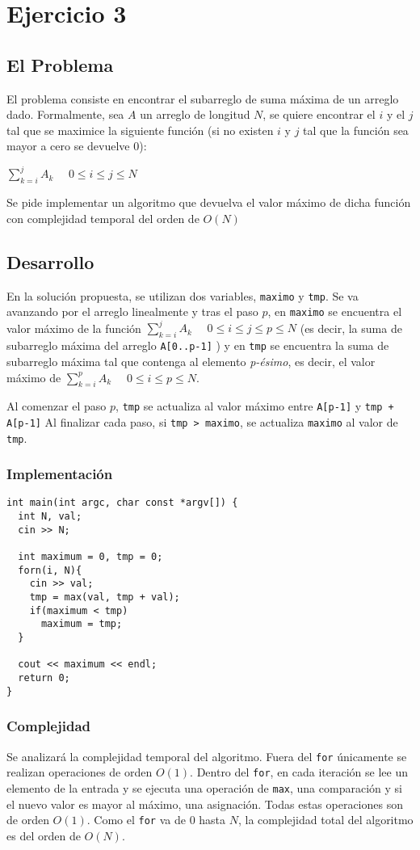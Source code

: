 \section{Ejercicio 3}
\subsection{El Problema}
El problema consiste en encontrar el subarreglo de suma máxima de un arreglo dado. Formalmente, sea $A$ un arreglo de longitud $N$, se quiere encontrar el $i$ y el $j$ tal que se maximice la siguiente función (si no existen $i$ y $j$ tal que la función sea mayor a cero se devuelve 0): 
\begin{center} $\sum_{k=i}^{j} A_k$            $ \quad 0\leq i\leq j\leq N$
\end{center}
Se pide implementar un algoritmo que devuelva el valor máximo de dicha función con complejidad temporal del orden de $O(N)$
\subsection{Desarrollo}
En la solución propuesta, se utilizan dos variables, \texttt{maximo} y \texttt{tmp}. Se va avanzando por el arreglo linealmente y tras el paso $p$, en  \texttt{maximo} se encuentra el valor máximo de la función $\sum_{k=i}^{j} A_k$            $ \quad 0\leq i\leq j\leq p \leq N$ (es decir, la suma de subarreglo máxima del arreglo  \texttt{A[0..p-1]} ) y en  \texttt{tmp} se encuentra la suma de subarreglo máxima tal que contenga al elemento \emph{p-ésimo}, es decir, el valor máximo de  $\sum_{k=i}^{p} A_k$            $ \quad 0\leq i\leq p\leq N$.


Al comenzar el paso $p$,  \texttt{tmp} se actualiza al valor máximo entre  \texttt{A[p-1]} y  \texttt{tmp + A[p-1]}
Al finalizar cada paso, si  \texttt{tmp > maximo}, se actualiza  \texttt{maximo} al valor de  \texttt{tmp}.
\subsubsection{Implementación}
\begin{verbatim}
int main(int argc, char const *argv[]) {
  int N, val;
  cin >> N;

  int maximum = 0, tmp = 0;
  forn(i, N){
    cin >> val;
    tmp = max(val, tmp + val);
    if(maximum < tmp)
      maximum = tmp;
  }

  cout << maximum << endl;
  return 0;
}
\end{verbatim}
\subsubsection{Complejidad}
Se analizará la complejidad temporal del algoritmo.
Fuera del \texttt{for} únicamente se realizan operaciones de orden $O(1)$. Dentro del \texttt{for}, en cada iteración se lee un elemento de la entrada y se ejecuta una operación de \texttt{max}, una comparación y si el nuevo valor es mayor al máximo, una asignación. Todas estas operaciones son de orden $O(1)$.
Como el \texttt{for} va de $0$ hasta $N$, la complejidad total del algoritmo es del orden de $O(N)$.